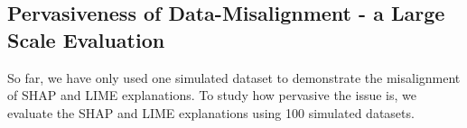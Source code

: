 \documentclass[mnsc,blindrev]{informs3}
\begin{document}
     
\subsection{Pervasiveness of Data-Misalignment - a Large Scale Evaluation}
    \label{sec:pervasive}
    So far, we have only used one simulated dataset to demonstrate the misalignment of SHAP and LIME explanations. To study how pervasive the issue is, %
    we evaluate the SHAP and LIME explanations using 100 simulated datasets.
\end{document}
